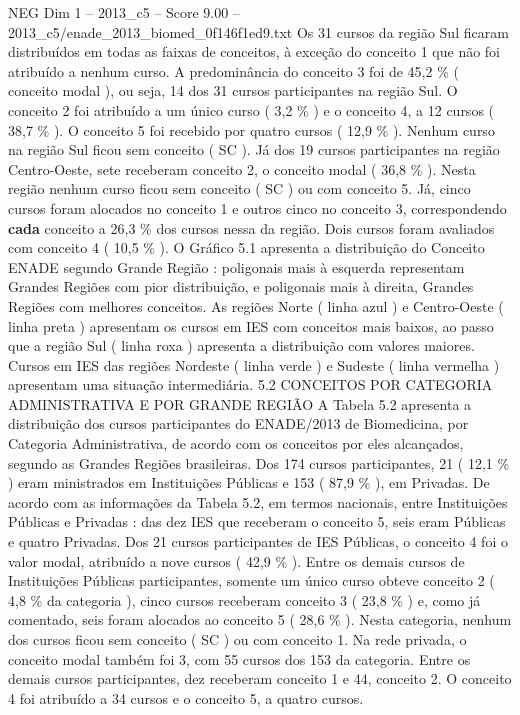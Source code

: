 \begin{textsample}{NEG Dim 1 – 2013\_c5 – Score 9.00 – 2013\_c5/enade\_2013\_biomed\_0f146f1ed9.txt}
Os 31 cursos da região Sul ficaram distribuídos em todas as faixas de conceitos, à exceção do conceito 1 que não foi atribuído a nenhum curso.
A predominância do conceito 3 foi de 45,2 \% ( conceito modal ), ou seja, 14 dos 31 cursos participantes na região Sul.
O conceito 2 foi atribuído a um único curso ( 3,2 \% ) e o conceito 4, a 12 cursos ( 38,7 \% ).
O conceito 5 foi recebido por quatro cursos ( 12,9 \% ).
Nenhum curso na região Sul ficou sem conceito ( SC ).
Já dos 19 cursos participantes na região Centro-Oeste, sete receberam conceito 2, o conceito modal ( 36,8 \% ).
Nesta região nenhum curso ficou sem conceito ( SC ) ou com conceito 5.
Já, cinco cursos foram alocados no conceito 1 e outros cinco no conceito 3, correspondendo \textbf{cada} conceito a 26,3 \% dos cursos nessa da região.
Dois cursos foram avaliados com conceito 4 ( 10,5 \% ).
O Gráfico 5.1 apresenta a distribuição do Conceito ENADE segundo Grande Região : poligonais mais à esquerda representam Grandes Regiões com pior distribuição, e poligonais mais à direita, Grandes Regiões com melhores conceitos.
As regiões Norte ( linha azul ) e Centro-Oeste ( linha preta ) apresentam os cursos em IES com conceitos mais baixos, ao passo que a região Sul ( linha roxa ) apresenta a distribuição com valores maiores.
Cursos em IES das regiões Nordeste ( linha verde ) e Sudeste ( linha vermelha ) apresentam uma situação intermediária. 5.2 CONCEITOS POR CATEGORIA ADMINISTRATIVA E POR GRANDE REGIÃO A Tabela 5.2 apresenta a distribuição dos cursos participantes do ENADE/2013 de Biomedicina, por Categoria Administrativa, de acordo com os conceitos por eles alcançados, segundo as Grandes Regiões brasileiras.
Dos 174 cursos participantes, 21 ( 12,1 \% ) eram ministrados em Instituições Públicas e 153 ( 87,9 \% ), em Privadas.
De acordo com as informações da Tabela 5.2, em termos nacionais, entre Instituições Públicas e Privadas : das dez IES que receberam o conceito 5, seis eram Públicas e quatro Privadas.
Dos 21 cursos participantes de IES Públicas, o conceito 4 foi o valor modal, atribuído a nove cursos ( 42,9 \% ).
Entre os demais cursos de Instituições Públicas participantes, somente um único curso obteve conceito 2 ( 4,8 \% da categoria ), cinco cursos receberam conceito 3 ( 23,8 \% ) e, como já comentado, seis foram alocados ao conceito 5 ( 28,6 \% ).
Nesta categoria, nenhum dos cursos ficou sem conceito ( SC ) ou com conceito 1.
Na rede privada, o conceito modal também foi 3, com 55 cursos dos 153 da categoria.
Entre os demais cursos participantes, dez receberam conceito 1 e 44, conceito 2.
O conceito 4 foi atribuído a 34 cursos e o conceito 5, a quatro cursos.

\end{textsample}

